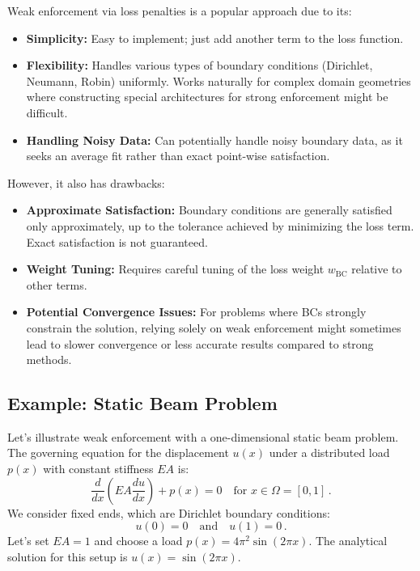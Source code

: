 Weak enforcement via loss penalties is a popular approach due to its:
\begin{itemize}
    \item \textbf{Simplicity:} Easy to implement; just add another term to the loss function.
    \item \textbf{Flexibility:} Handles various types of boundary conditions (Dirichlet, Neumann, Robin) uniformly. Works naturally for complex domain geometries where constructing special architectures for strong enforcement might be difficult.
    \item \textbf{Handling Noisy Data:} Can potentially handle noisy boundary data, as it seeks an average fit rather than exact point-wise satisfaction.
\end{itemize}
However, it also has drawbacks:
\begin{itemize}
    \item \textbf{Approximate Satisfaction:} Boundary conditions are generally satisfied only approximately, up to the tolerance achieved by minimizing the loss term. Exact satisfaction is not guaranteed.
    \item \textbf{Weight Tuning:} Requires careful tuning of the loss weight $w_{\text{BC}}$ relative to other terms.
    \item \textbf{Potential Convergence Issues:} For problems where BCs strongly constrain the solution, relying solely on weak enforcement might sometimes lead to slower convergence or less accurate results compared to strong methods.
\end{itemize}

\subsection{Example: Static Beam Problem}
\label{subsec:static_beam_weak}


Let's illustrate weak enforcement with a one-dimensional static beam problem. The governing equation for the displacement $u(x)$ under a distributed load $p(x)$ with constant stiffness $EA$ is:
%
\begin{equation*}
\frac{d}{dx}\left(EA\frac{du}{dx}\right) + p(x) = 0 \quad \text{for } x \in \Omega = [0,1]\,.
\end{equation*}
%
We consider fixed ends, which are Dirichlet boundary conditions:
%
\begin{equation*}
u(0) = 0 \quad \text{and} \quad u(1) = 0\,.
\end{equation*}
%
Let's set $EA=1$ and choose a load $p(x) = 4\pi^2\sin(2\pi x)$. The analytical solution for this setup is $u(x) = \sin(2\pi x)$.


